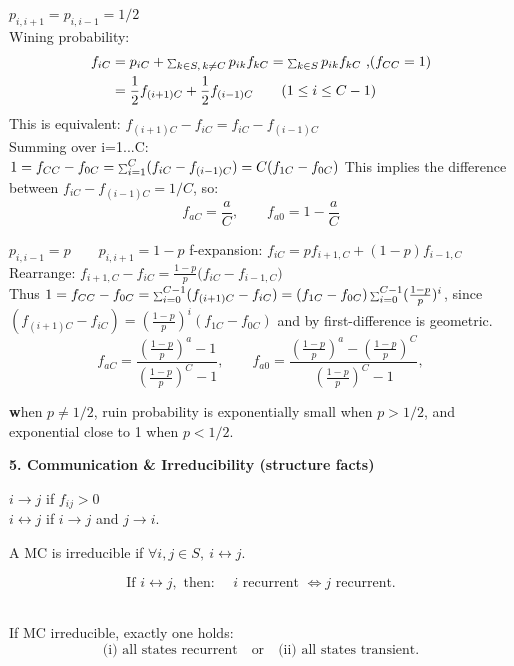 \documentclass[a4paper, landscape]{article}
\newcommand{\topic}[1]{\par\medskip\textbf{#1}\par}
\newcommand{\subtopic}[1]{\par\textbf{#1}}
\newcommand{\smallsum}{\mathop{\scalebox{0.65}{$\sum$}}\nolimits}
\renewcommand{\topic}[1]{\par\medskip\noindent\colorbox{highlightcolor}{\parbox{\dimexpr\columnwidth-2\fboxsep\relax}{\textbf{#1}}}\par}
\renewcommand{\subtopic}[1]{\par\textbf{\color{blue}{#1}}} %
\begin{document}
\begin{multicols}{4}
\subtopic{Symmetric case $p=1/2$:} $p_{i,i+1}=p_{i,i-1}=1/2$\\
Wining probability:
\begin{align*}
f_{iC}&=p_{iC}+\smallsum_{k\in S,\,k\neq C} p_{ik} f_{kC}
=\smallsum_{k\in S}p_{ik}f_{kC} \text{ ,($f_{CC}=1$)}\\
&=  
\frac12 f_{(i+1)C} + \frac12 f_{(i-1)C} \qquad (1\le i\le C-1)
\end{align*}
This is equivalent: $f_{(i+1)C}-f_{iC} = f_{iC}-f_{(i-1)C}$\\
Summing over i=1...C: \\
$1=f_{CC}-f_{0C}=\smallsum_{i=1}^C(f_{iC}-f_{(i-1)C})=C(f_{1C}-f_{0C})$
This implies the difference between  $f_{iC}-f_{(i-1)C}=1/C$, so:
\[
f_{aC}=\frac{a}{C},\qquad f_{a0}=1-\frac{a}{C}
\]

\subtopic{Biased case $p\neq 1/2$:} $p_{i,i-1}=p \qquad p_{i,i+1} = 1-p$
f-expansion: $f_{iC}=p f_{i+1,C}+(1-p)f_{i-1,C}$\\
Rearrange:
$f_{i+1,C}-f_{iC}=\frac{1-p}{p}\bigl(f_{iC}-f_{i-1,C}\bigr)$\\
Thus $1=f_{CC}-f_{0C}=\smallsum_{i=0}^{C-1}(f_{(i+1)C}-f_{iC})=(f_{1C}-f_{0C})\smallsum_{i=0}^{C-1}(\frac{1-p}{p})^i$, since $(f_{(i+1)C}-f_{iC})=(\frac{1-p}{p})^i(f_{1C}-f_{0C})$ and by first-difference is geometric. 
\[
f_{aC}=
\frac{\left(\frac{1-p}{p}\right)^a-1}
{\left(\frac{1-p}{p}\right)^C-1},
\qquad
f_{a0}=
\frac{\left(\frac{1-p}{p}\right)^a-\left(\frac{1-p}{p}\right)^C}
{\left(\frac{1-p}{p}\right)^C-1},
\]

\textbf when $p\neq 1/2$, ruin probability is exponentially small when $p>1/2$, and exponential close to 1 when $p <1/2$.

\topic{5. Communication \& Irreducibility (structure facts)}
\subtopic{Communication:}
$i\to j$ if $f_{ij}>0$ \\
$i\leftrightarrow j$ if $i\to j$ and $j\to i$.

\subtopic{Irreducible:}
A MC is irreducible if $\forall i,j\in S,\ i\leftrightarrow j$.

\subtopic{Key consequence: same type in a class}

\[
\text{If } i\leftrightarrow j, \text{ then: }\quad
i\text{ recurrent } \iff j\text{ recurrent.}
\]

\subtopic{Case theorem (irreducible dichotomy):}\\
If MC irreducible, exactly one holds:
\[
\text{(i) all states recurrent}\quad\text{or}\quad\text{(ii) all states transient}.
\]


\end{multicols}
\end{document}
